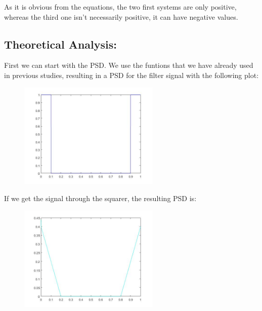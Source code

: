 \documentclass[a4paper,11pt]{article}
\begin{document}
As it is obvious from the equations, the two first systems are only positive, whereas the third one isn't necessarily positive, it can have negative values.

\newpage

\subsection{Theoretical Analysis:}

First we can start with the PSD. We use the funtions that we have already used in previous studies, resulting in a PSD for the filter signal with the following plot:

\begin{figure}[!hp]
    \begin{center}
    \includegraphics[width=0.6\textwidth]{images/lab3_figure9_1.jpg}
    \end{center}
\end{figure}

If we get the signal through the squarer, the resulting PSD is:

\begin{figure}[!hp]
    \begin{center}
    \includegraphics[width=0.6\textwidth]{images/lab3_figure9_2.jpg}
    \end{center}
\end{figure}
\end{document}
